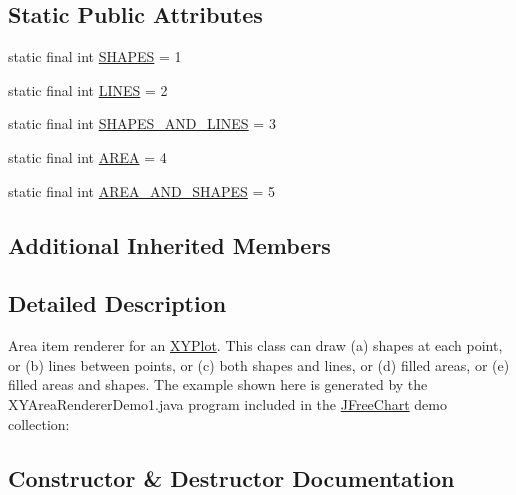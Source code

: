 \subsection*{Static Public Attributes}
\begin{DoxyCompactItemize}
\item 
static final int \mbox{\hyperlink{classorg_1_1jfree_1_1chart_1_1renderer_1_1xy_1_1_x_y_area_renderer_ab5ba9c8c1808cf2305034bd0c10b8c34}{S\+H\+A\+P\+ES}} = 1
\item 
static final int \mbox{\hyperlink{classorg_1_1jfree_1_1chart_1_1renderer_1_1xy_1_1_x_y_area_renderer_a6d36ba37b76e16bd60d5a75c095df3b6}{L\+I\+N\+ES}} = 2
\item 
static final int \mbox{\hyperlink{classorg_1_1jfree_1_1chart_1_1renderer_1_1xy_1_1_x_y_area_renderer_a98e7d447f411b7ff622323fb827a3995}{S\+H\+A\+P\+E\+S\+\_\+\+A\+N\+D\+\_\+\+L\+I\+N\+ES}} = 3
\item 
static final int \mbox{\hyperlink{classorg_1_1jfree_1_1chart_1_1renderer_1_1xy_1_1_x_y_area_renderer_af38665c90662e49e8a30ad2be5a8f8d8}{A\+R\+EA}} = 4
\item 
static final int \mbox{\hyperlink{classorg_1_1jfree_1_1chart_1_1renderer_1_1xy_1_1_x_y_area_renderer_a945b9669bfc59c8a98ac7311430edca5}{A\+R\+E\+A\+\_\+\+A\+N\+D\+\_\+\+S\+H\+A\+P\+ES}} = 5
\end{DoxyCompactItemize}
\subsection*{Additional Inherited Members}


\subsection{Detailed Description}
Area item renderer for an \mbox{\hyperlink{}{X\+Y\+Plot}}. This class can draw (a) shapes at each point, or (b) lines between points, or (c) both shapes and lines, or (d) filled areas, or (e) filled areas and shapes. The example shown here is generated by the {\ttfamily X\+Y\+Area\+Renderer\+Demo1.\+java} program included in the \mbox{\hyperlink{classorg_1_1jfree_1_1chart_1_1_j_free_chart}{J\+Free\+Chart}} demo collection\+: ~\newline
~\newline
  

\subsection{Constructor \& Destructor Documentation}
\mbox{\label{classorg_1_1jfree_1_1chart_1_1renderer_1_1xy_1_1_x_y_area_renderer_a75bfe51ada4bc753d9064b63efd38cb9}} 
